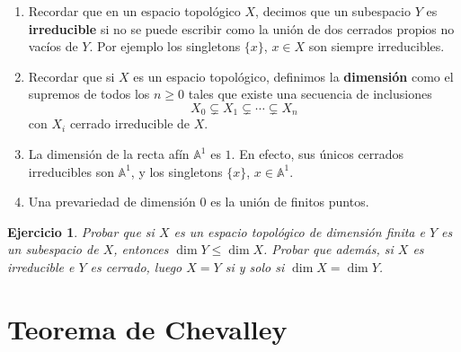 \documentclass[12pt]{article}
\theoremstyle{customTheorem}
\theoremstyle{customDefinition}
\newtheorem{exercise}[theorem]{Ejercicio}
\newcommand{\afine}[1]{\mathbb{A}^{#1}}
\begin{document}
\begin{enumerate}
    \item Recordar que en un espacio topológico $X$, decimos que un subespacio $Y$ es \textbf{irreducible} si no se puede escribir como la unión de dos cerrados propios no vacíos de $Y$. Por ejemplo los singletons $\{x\}$, $x \in X$ son siempre irreducibles.
    \item Recordar que si $X$ es un espacio topológico, definimos la \textbf{dimensión} como el supremos de todos los $n \geq 0$ tales que existe una secuencia de inclusiones
    \[
    X_0 \subsetneq X_1 \subsetneq \cdots \subsetneq X_n
    \]
    con $X_i$ cerrado irreducible de $X$.
    \item  La dimensión de la recta afín $\afine 1$ es $1$. En efecto, sus únicos cerrados irreducibles son $\afine 1$, y los singletons $\{x\}$, $x \in \afine 1$.
    \item Una prevariedad de dimensión $0$ es la unión de finitos puntos.
\end{enumerate}

\begin{exercise}\label{Ejercicio}
    Probar que si $X$ es un espacio topológico de dimensión finita e $Y$ es un subespacio de $X$, entonces $\dim Y \leq \dim X$. Probar que además, si $X$ es irreducible e $Y$ es cerrado, luego $X= Y$ si y solo si $\dim X = \dim Y$.
\end{exercise}

\section{Teorema de Chevalley}
\end{document}
